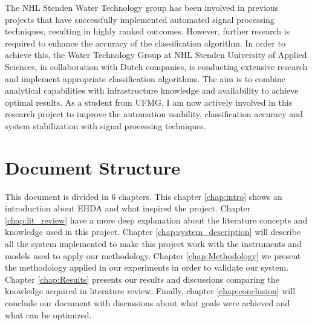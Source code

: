 The NHL Stenden Water Technology group has been involved in previous projects that have successfully implemented automated signal processing techniques, resulting in highly ranked outcomes. 
However, further research is required to enhance the accuracy of the classification algorithm. In order to achieve this, the Water Technology Group at NHL Stenden University of Applied Sciences, in collaboration with Dutch companies, is conducting extensive research and implement appropriate classification algorithms. The aim is to combine analytical capabilities with infrastructure knowledge and availability to achieve optimal results.
As a student from UFMG, I am now actively involved in this research project to improve the automation usability, classification accuracy and system stabilization with signal processing techniques.

\section{Document Structure}
\label{sec:doc_struct}

This document is divided in 6 chapters. 
This chapter \ref{chap:intro} shows an introduction about EHDA and what inspired the project. 
Chapter \ref{chap:lit_review} have a more deep explanation about the literature concepts and knowledge used in this project. 
Chapter \ref{chap:system_description} will describe all the system implemented to make this project work with the instruments and models used to apply our methodology.
Chapter \ref{chap:Methodology} we present the methodology applied in our experiments in order to validate our system.
Chapter \ref{chap:Results} presents our results and discussions comparing the knowledge acquired in literature review.
Finally, chapter \ref{chap:conclusion} will conclude our document with discussions about what goals were achieved and what can be optimized.
